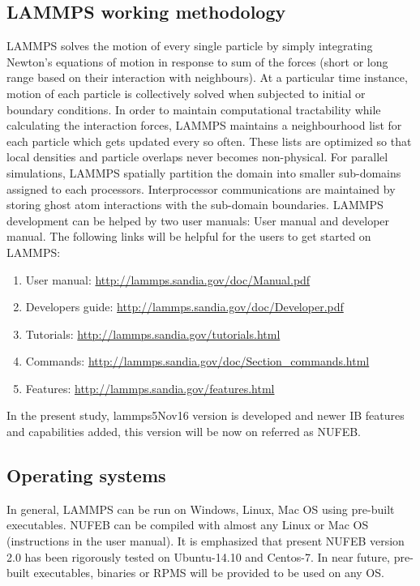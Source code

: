 \documentclass[11pt,a4paper,openright]{article}
\begin{document}
\subsection{LAMMPS working methodology}
LAMMPS solves the motion of every single particle by simply integrating Newton's equations of motion in response to sum of the forces (short or long range based on their interaction with neighbours). At a particular time instance, motion of each particle is collectively solved when subjected to initial or boundary conditions. In order to maintain computational tractability while calculating the interaction forces, LAMMPS maintains a neighbourhood list for each particle which gets updated every so often. These lists are optimized so that local densities and particle overlaps never becomes non-physical. For parallel simulations, LAMMPS spatially partition the domain into smaller sub-domains assigned to each processors. Interprocessor communications are maintained by storing ghost atom interactions with the sub-domain boundaries. LAMMPS development can be helped by two user manuals: User manual and developer manual. The following links will be helpful for the users to get started on LAMMPS:

\begin{enumerate}
\item User manual: \url{http://lammps.sandia.gov/doc/Manual.pdf}
\item Developers guide: \url{http://lammps.sandia.gov/doc/Developer.pdf}
\item Tutorials: \url{http://lammps.sandia.gov/tutorials.html}
\item Commands: \url{http://lammps.sandia.gov/doc/Section_commands.html}
\item Features: \url{http://lammps.sandia.gov/features.html}
\end{enumerate}

In the present study, lammps5Nov16 version is developed and newer IB features and capabilities added, this version will be now on referred as NUFEB. 

\subsection{Operating systems}
In general, LAMMPS can be run on Windows, Linux, Mac OS using pre-built executables. NUFEB can be compiled with almost any Linux or Mac OS (instructions in the user manual). It is emphasized that present NUFEB version 2.0 has been rigorously tested on Ubuntu-14.10 and Centos-7. In near future, pre-built executables, binaries or RPMS will be provided to be used on any OS.
\end{document}
